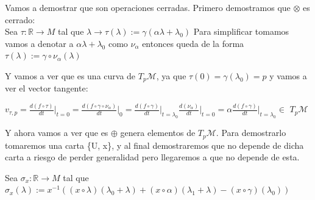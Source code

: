 \documentclass[pdftex,11pt,a4paper]{book}
\newcommand{\tpm}{$T_p\mathscr{M}$}
\newcommand{\R}{$\mathbb{R}$}
\begin{document}
Vamos a demostrar que son operaciones cerradas. Primero demostramos que $\otimes$ es cerrado: 
\\Sea $\tau :$\R$  \to M$ tal que $\lambda \to \tau(\lambda) := \gamma(\alpha \lambda + \lambda_0)$ Para simplificar tomamos vamos a denotar a  $\alpha \lambda + \lambda_0$ como $\nu_\alpha$ entonces queda de la forma $ \tau(\lambda) := \gamma\circ \nu_\alpha(\lambda)$

Y vamos a ver que es una curva de \tpm , ya que $\tau(0) = \gamma(\lambda_0) = p$ y vamos a ver el vector tangente: 
\begin{center}
$v_{\tau, p} = \frac{d(f \circ \tau)}{dt}\bigg|_{t= 0} = \frac{d(f\circ \gamma \circ \nu_\alpha)}{dt}\bigg|_0 = \frac{d(f\circ \gamma)}{dt}\bigg|_{t=\lambda_0} \frac{d(\nu_\alpha)}{dt}\bigg|_{t=0} = \alpha \frac{d(f\circ \gamma)}{dt}\bigg|_{t = \lambda_0} \in$ \tpm
\end{center}

Y ahora vamos a ver que es $\oplus$ genera elementos de \tpm . Para demostrarlo tomaremos una carta \{U, x\}, y al final demostraremos que no depende de dicha carta a riesgo de perder generalidad pero llegaremos a que no depende de esta.

Sea $\sigma_x :$\R $\to M$ tal que $\sigma_x(\lambda) := x^{-1}((x\circ \lambda)(\lambda_0 + \lambda) + (x \circ \alpha)(\lambda_1 + \lambda) - (x \circ \gamma)(\lambda_0))$ 
\end{document}
